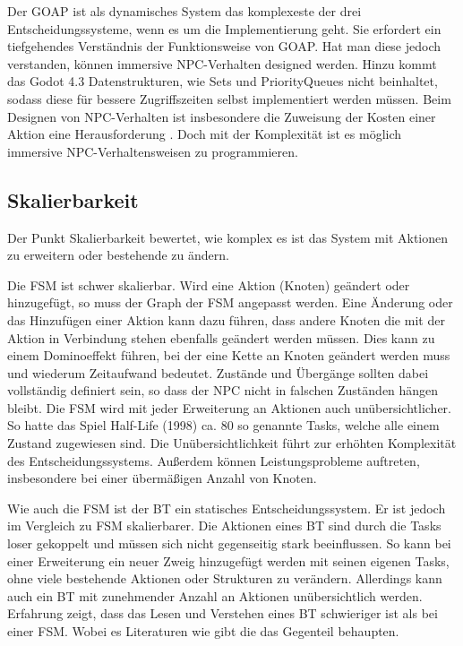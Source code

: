 Der GOAP ist als dynamisches System das komplexeste der drei Entscheidungssysteme, wenn es um die Implementierung geht. Sie erfordert ein tiefgehendes Verst\"{a}ndnis der Funktionsweise von GOAP. Hat man diese jedoch verstanden, k\"{o}nnen immersive NPC-Verhalten designed werden. Hinzu kommt das Godot 4.3 Datenstrukturen, wie Sets und PriorityQueues nicht beinhaltet, sodass diese f\"{u}r bessere Zugriffszeiten selbst implementiert werden m\"{u}ssen. Beim Designen von NPC-Verhalten ist insbesondere die Zuweisung der Kosten einer Aktion eine Herausforderung \autocite{Schwab2021}. Doch mit der Komplexit\"{a}t ist es m\"{o}glich immersive NPC-Verhaltensweisen zu programmieren.


\subsection{Skalierbarkeit}
\label{chap:skalierbarkeit}

Der Punkt Skalierbarkeit bewertet, wie komplex es ist das System mit Aktionen zu erweitern oder bestehende zu \"{a}ndern.

Die FSM ist schwer skalierbar. Wird eine Aktion (Knoten) ge\"{a}ndert oder hinzugef\"{u}gt, so muss der Graph der FSM angepasst werden. Eine \"{A}nderung oder das Hinzuf\"{u}gen einer Aktion kann dazu f\"{u}hren, dass andere Knoten die mit der Aktion in Verbindung stehen ebenfalls ge\"{a}ndert werden m\"{u}ssen. Dies kann zu einem Dominoeffekt f\"{u}hren, bei der eine Kette an Knoten ge\"{a}ndert werden muss und wiederum Zeitaufwand bedeutet. Zust\"{a}nde und \"{U}berg\"{a}nge sollten dabei vollst\"{a}ndig definiert sein, so dass der NPC nicht in falschen Zust\"{a}nden h\"{a}ngen bleibt. Die FSM wird mit jeder Erweiterung an Aktionen auch un\"{u}bersichtlicher. So hatte das Spiel Half-Life (1998) ca. 80 so genannte Tasks, welche alle einem Zustand zugewiesen sind. Die Un\"{u}bersichtlichkeit f\"{u}hrt zur erh\"{o}hten Komplexit\"{a}t des Entscheidungssystems. Au\ss{}erdem k\"{o}nnen Leistungsprobleme auftreten, insbesondere bei einer \"{u}berm\"{a}\ss{}igen Anzahl von Knoten. \autocite{U2023}

Wie auch die FSM ist der BT ein statisches Entscheidungssystem. Er ist jedoch im Vergleich zu FSM skalierbarer. Die Aktionen eines BT sind durch die Tasks loser gekoppelt und m\"{u}ssen sich nicht gegenseitig stark beeinflussen. So kann bei einer Erweiterung ein neuer Zweig hinzugef\"{u}gt werden mit seinen eigenen Tasks, ohne viele bestehende Aktionen oder Strukturen zu ver\"{a}ndern.\autocite{aiag} Allerdings kann auch ein BT mit zunehmender Anzahl an Aktionen un\"{u}bersichtlich werden. Erfahrung zeigt, dass das Lesen und Verstehen eines BT schwieriger ist als bei einer FSM. Wobei es Literaturen wie \autocite{} gibt die das Gegenteil behaupten.

